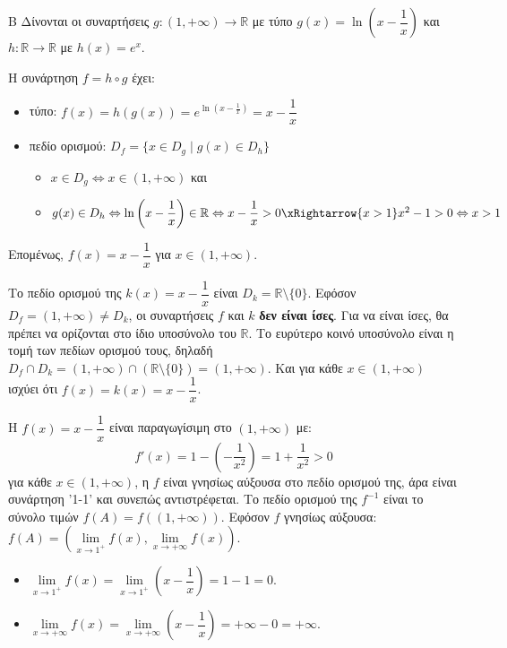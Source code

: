 \begin{thema}{Β}
Δίνονται οι συναρτήσεις $g:(1,+\infty)\to\mathbb{R}$ με τύπο $g(x)=\ln\left(x-\dfrac{1}{x}\right)$ και $h:\mathbb{R}\to\mathbb{R}$ με $h(x)=e^x$.

\begin{erwthma}
\item Η συνάρτηση $f=h\circ g$ έχει:
\begin{itemize}
\item τύπο: $f(x) = h(g(x)) = e^{\ln(x-\frac{1}{x})} = x - \dfrac{1}{x}$
\item πεδίο ορισμού: $D_f = \{x\in D_g \mid g(x)\in D_h\}$
\begin{itemize}[label=\tiny\faPlay]
\item $x\in D_g\Leftrightarrow x\in(1,+\infty)$ και 
\item $g(x)\in D_h\Leftrightarrow \ln{\left(x-\dfrac{1}{x}\right)}\in\mathbb{R}\Leftrightarrow x-\dfrac{1}{x}>0\xRightarrow{x>1}x^2-1>0\Leftrightarrow x>1$
\end{itemize}
\end{itemize}
Επομένως, $f(x) = x - \dfrac{1}{x}$ για $x \in (1, +\infty)$.

\item Το πεδίο ορισμού της $k(x) = x - \dfrac{1}{x}$ είναι $D_k = \mathbb{R} \setminus \{0\}$.
Εφόσον $D_f = (1, +\infty) \ne D_k$, οι συναρτήσεις $f$ και $k$ \textbf{δεν είναι ίσες}.
Για να είναι ίσες, θα πρέπει να ορίζονται στο ίδιο υποσύνολο του $\mathbb{R}$. Το ευρύτερο κοινό υποσύνολο είναι η τομή των πεδίων ορισμού τους, δηλαδή $D_f \cap D_k = (1, +\infty) \cap (\mathbb{R} \setminus \{0\}) = (1, +\infty)$.
Και για κάθε $x \in (1, +\infty)$ ισχύει ότι $f(x) = k(x) = x - \dfrac{1}{x}$.

\item Η $f(x) = x - \dfrac{1}{x}$ είναι παραγωγίσιμη στο $(1, +\infty)$ με:
\[f'(x) = 1 - \left(-\dfrac{1}{x^2}\right) = 1 + \dfrac{1}{x^2}>0\]
για κάθε $x \in (1, +\infty)$, η $f$ είναι γνησίως αύξουσα στο πεδίο ορισμού της, άρα είναι συνάρτηση '1-1' και συνεπώς αντιστρέφεται. Το πεδίο ορισμού της $f^{-1}$ είναι το σύνολο τιμών $f(A) = f((1, +\infty))$. Εφόσον $f$ γνησίως αύξουσα:
$f(A) = \left( \lim\limits_{x\to1^+} f(x), \lim\limits_{x\to+\infty} f(x) \right)$.

\begin{itemize}
\item $\lim\limits_{x\to1^+} f(x) = \lim\limits_{x\to1^+} \left(x - \dfrac{1}{x}\right) = 1 - 1 = 0$.
\item $\lim\limits_{x\to+\infty} f(x) = \lim\limits_{x\to+\infty} \left(x - \dfrac{1}{x}\right) = +\infty - 0 = +\infty$.
\end{itemize}


\end{erwthma}
\end{thema}
